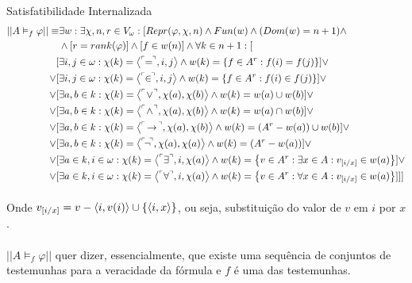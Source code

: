         \begin{definition}{Satisfatibilidade Internalizada}
            \begin{align*}
                || A \vDash_f \varphi ||\equiv&\exists w:\exists \chi,n,r\in V_\omega:[Repr(\varphi,\chi,n)\land Fun(w)\land (Dom(w) = n+1)\land\\
                    &\land [r = rank(\varphi)] \land [f\in w(n)]\land\forall k \in n+1:[\\
                            [&\exists i, j\in\omega     : \chi(k) = \TUPLE{\FMLA{\!\!=\!\!}}{  i    }{    j  } \land w(k) = \SET{f \in A^r : f(i)  = f(j)}]\lor\\
                        \lor[&\exists i, j\in\omega     : \chi(k) = \TUPLE{\FMLA{\!\!\in\!\!}}{i    }{    j  } \land w(k) = \SET{f \in A^r : f(i)\in f(j)}]\lor\\
                        \lor[&\exists a, b\in   k       : \chi(k) = \TUPLE{\FMLA{\!\lor\! }}{\chi(a)}{\chi(b)} \land w(k) = w(a)\cup w(b)]\lor\\
                        \lor[&\exists a, b\in   k       : \chi(k) = \TUPLE{\FMLA{\!\land\!}}{\chi(a)}{\chi(b)} \land w(k) = w(a)\cap w(b)]\lor\\
                        \lor[&\exists a, b\in   k       : \chi(k) = \TUPLE{\FMLA{\!\rar\!}}{\chi(a)}{\chi(b) } \land w(k) = (A^r - w(a))\cup w(b)]\lor\\
                        \lor[&\exists a, b\in   k       : \chi(k) = \TUPLE{\FMLA{\!\neg\!}}{\chi(a)}{\chi(a) } \land w(k) = (A^r - w(a))]\lor\\
                        \lor[&\exists a\in k, i\in\omega: \chi(k) = \TUPLE{\FMLA{\exists }}{   i   }{\chi(a) } \land w(k) = \SET{v\in A^r : \exists x\in A: v_{[i\slash x]}\in w(a) }]\lor\\
                        \lor[&\exists a\in k, i\in\omega: \chi(k) = \TUPLE{\FMLA{\forall }}{   i   }{\chi(a) } \land w(k) = \SET{v\in A^r : \forall x\in A: v_{[i\slash x]}\in w(a) }]]]
            \end{align*}
            
            \paragraph{}
                Onde $v_{[i\slash x]} = v - \TUPLE{i}{v(i)} \cup \SET{\TUPLE{i}{x}}$, ou seja, substituição do valor de $v$ em $i$ por $x$.
            \paragraph{}
                $|| A \vDash_f \varphi ||$ quer dizer, essencialmente, que existe uma sequência de conjuntos de testemunhas para a veracidade 
                da fórmula e $f$ é uma das testemunhas.
    
        \end{definition}


